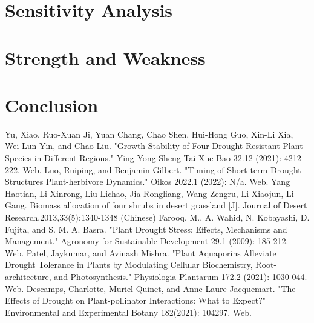 \documentclass[12pt]{article}  %
\numberwithin{equation}{section} %
\begin{document}
\section{Sensitivity Analysis}
\section{Strength and Weakness}
\section{Conclusion}


\clearpage
\begin{thebibliography}{99}
	 Yu, Xiao, Ruo-Xuan Ji, Yuan Chang, Chao Shen, Hui-Hong Guo, Xin-Li Xia, Wei-Lun Yin, and Chao Liu. "Growth Stability of Four Drought Resistant Plant Species in Different Regions." Ying Yong Sheng Tai Xue Bao 32.12 (2021): 4212-222. Web.
	 Luo, Ruiping, and Benjamin Gilbert. "Timing of Short-term Drought Structures Plant-herbivore Dynamics." Oikos 2022.1 (2022): N/a. Web.
	 Yang Haotian, Li Xinrong, Liu Lichao, Jia Rongliang, Wang Zengru, Li Xiaojun, Li Gang. Biomass allocation of four shrubs in desert grassland [J]. Journal of Desert Research,2013,33(5):1340-1348 (Chinese)
	  Farooq, M., A. Wahid, N. Kobayashi, D. Fujita, and S. M. A. Basra. "Plant Drought Stress: Effects, Mechanisms and Management." Agronomy for Sustainable Development 29.1 (2009): 185-212. Web.
	Patel, Jaykumar, and Avinash Mishra. "Plant Aquaporins Alleviate Drought Tolerance in Plants by Modulating Cellular Biochemistry, Root-architecture, and Photosynthesis." Physiologia Plantarum 172.2 (2021): 1030-044. Web.
	Descamps, Charlotte, Muriel Quinet, and Anne-Laure Jacquemart. "The Effects of Drought on Plant-pollinator Interactions: What to Expect?" Environmental and Experimental Botany 182(2021): 104297. Web.

\end{thebibliography}
\end{document}
